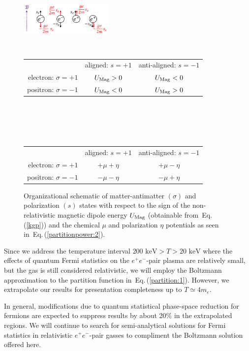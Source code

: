 \documentclass[aps,prd,floatfix,reprint]{revtex4-2}
\newcommand*{\keV}{\text{ keV}}
\newcommand{\req}[1]{Eq.\,(\ref{#1})}
\newcommand\Tstrut{\rule{0pt}{2.6ex}} %
\newcommand\Bstrut{\rule[-0.9ex]{0pt}{0pt}} %
\newcommand{\TBstrut}{\Tstrut\Bstrut} %
\begin{document}
\begin{figure}[ht]
 \centering
 \includegraphics[width=0.4\textwidth]{plots/schematic.png}\Bstrut\\
 \begin{tabular}{ r|c|c| }
 \multicolumn{1}{r}{}
 & \multicolumn{1}{c}{aligned: $s=+1$}
 & \multicolumn{1}{c}{anti-aligned: $s=-1$} \\
 \cline{2-3}
 electron: $\sigma=+1$ & $U_{\rm Mag}>0$ & $U_{\rm Mag}<0$ \TBstrut\\
 \cline{2-3}
 positron: $\sigma=-1$ & $U_{\rm Mag}<0$ & $U_{\rm Mag}>0$ \TBstrut\\
 \cline{2-3}
 \end{tabular}\\\,\TBstrut\\
 \begin{tabular}{ r|c|c| }
 \multicolumn{1}{r}{}
 & \multicolumn{1}{c}{aligned: $s=+1$}
 & \multicolumn{1}{c}{anti-aligned: $s=-1$} \\
 \cline{2-3}
 electron: $\sigma=+1$ & $+\mu+\eta$ & $+\mu-\eta$ \TBstrut\\
 \cline{2-3}
 positron: $\sigma=-1$ & $-\mu-\eta$ & $-\mu+\eta$ \TBstrut\\
 \cline{2-3}
 \end{tabular}
 \caption{Organizational schematic of matter-antimatter $(\sigma)$ and polarization $(s)$ states with respect to the sign of the non-relativistic magnetic dipole energy $U_{\rm Mag}$ (obtainable from~\req{kgp}) and the chemical $\mu$ and polarization $\eta$ potentials as seen in~\req{partitionpower:2}.}
 \label{fig:schematic}
\end{figure}


Since we address the temperature interval $200\keV>T>20\keV$ where the effects of quantum Fermi statistics on the $e^{+}e^{-}$-pair plasma are relatively small, but the gas is still considered relativistic, we will employ the Boltzmann approximation to the partition function in~\req{partition:1}. However, we extrapolate our results for presentation completeness up to $T\simeq 4m_{e}$.

In general, modifications due to quantum statistical phase-space reduction for fermions are expected to suppress results by about 20\% in the extrapolated regions. We will continue to search for semi-analytical solutions for Fermi statistics in relativistic $e^{+}e^{-}$-pair gasses to compliment the Boltzmann solution offered here. 
\end{document}
